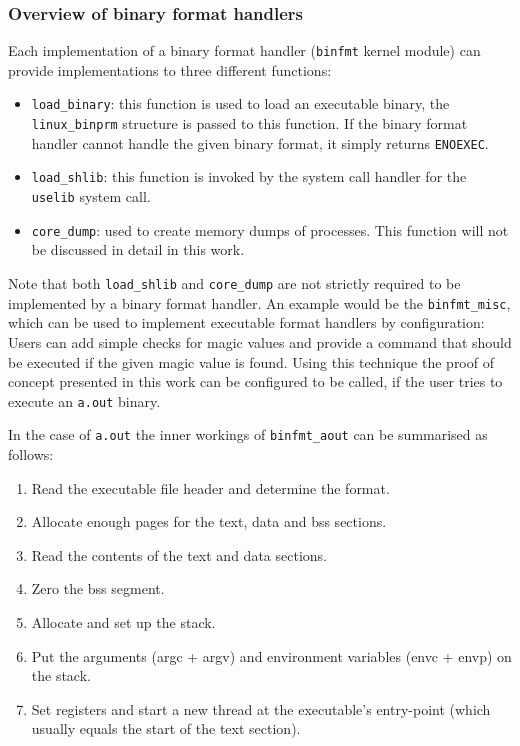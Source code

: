 \documentclass{article}
\begin{document}
\subsubsection{Overview of binary format handlers}

Each implementation of a binary format handler (\texttt{binfmt} kernel module) can provide implementations to three different functions:

\begin{itemize}
    \item \texttt{load\_binary}: this function is used to load an executable binary, the \texttt{linux\_binprm} structure is passed to this function. If the binary format handler cannot handle the given binary format, it simply returns \texttt{ENOEXEC}.
    \item \texttt{load\_shlib}: this function is invoked by the system call handler for the \texttt{uselib} system call.
    \item \texttt{core\_dump}: used to create memory dumps of processes. This function will not be discussed in detail in this work.
\end{itemize}

Note that both \texttt{load\_shlib} and \texttt{core\_dump} are not strictly required to be implemented by a binary format handler. An example would be the \texttt{binfmt\_misc}, which can be used to implement executable format handlers by configuration: Users can add simple checks for magic values and provide a command that should be executed if the given magic value is found. Using this technique the proof of concept presented in this work can be configured to be called, if the user tries to execute an \texttt{a.out} binary.

In the case of \texttt{a.out} the inner workings of \texttt{binfmt\_aout} can be summarised as follows:

\begin{enumerate}
    \item Read the executable file header and determine the format.
    \item Allocate enough pages for the text, data and bss sections.
    \item Read the contents of the text and data sections.
    \item Zero the bss segment.
    \item Allocate and set up the stack.
    \item Put the arguments (argc + argv) and environment variables (envc + envp) on the stack.
    \item Set registers and start a new thread at the executable's entry-point (which usually equals the start of the text section).
\end{enumerate}
\end{document}
